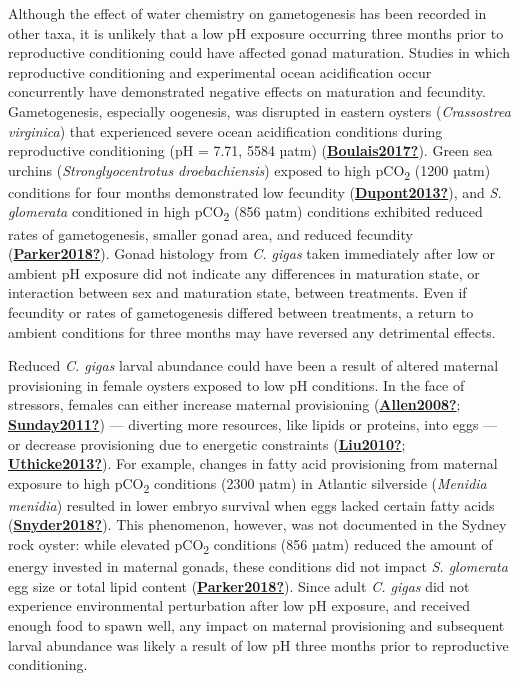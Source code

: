 \documentclass [11pt, proquest] {uwthesis}[2015/03/03]
\begin{document}
Although the effect of water chemistry on gametogenesis has been recorded in other taxa, it is unlikely that a low pH exposure occurring three months prior to reproductive conditioning could have affected gonad maturation. Studies in which reproductive conditioning and experimental ocean acidification occur concurrently have demonstrated negative effects on maturation and fecundity. Gametogenesis, especially oogenesis, was disrupted in eastern oysters (\emph{Crassostrea virginica}) that experienced severe ocean acidification conditions during reproductive conditioning (pH = 7.71, 5584 µatm) (\protect\hyperlink{ref-Boulais2017}{\textbf{Boulais2017?}}). Green sea urchins (\emph{Stronglyocentrotus droebachiensis}) exposed to high pCO\textsubscript{2} (1200 µatm) conditions for four months demonstrated low fecundity (\protect\hyperlink{ref-Dupont2013}{\textbf{Dupont2013?}}), and \emph{S. glomerata} conditioned in high pCO\textsubscript{2} (856 µatm) conditions exhibited reduced rates of gametogenesis, smaller gonad area, and reduced fecundity (\protect\hyperlink{ref-Parker2018}{\textbf{Parker2018?}}). Gonad histology from \emph{C. gigas} taken immediately after low or ambient pH exposure did not indicate any differences in maturation state, or interaction between sex and maturation state, between treatments. Even if fecundity or rates of gametogenesis differed between treatments, a return to ambient conditions for three months may have reversed any detrimental effects.

Reduced \emph{C. gigas} larval abundance could have been a result of altered maternal provisioning in female oysters exposed to low pH conditions. In the face of stressors, females can either increase maternal provisioning (\protect\hyperlink{ref-Allen2008}{\textbf{Allen2008?}}; \protect\hyperlink{ref-Sunday2011}{\textbf{Sunday2011?}}) --- diverting more resources, like lipids or proteins, into eggs --- or decrease provisioning due to energetic constraints (\protect\hyperlink{ref-Liu2010}{\textbf{Liu2010?}}; \protect\hyperlink{ref-Uthicke2013}{\textbf{Uthicke2013?}}). For example, changes in fatty acid provisioning from maternal exposure to high pCO\textsubscript{2} conditions (2300 µatm) in Atlantic silverside (\emph{Menidia menidia}) resulted in lower embryo survival when eggs lacked certain fatty acids (\protect\hyperlink{ref-Snyder2018}{\textbf{Snyder2018?}}). This phenomenon, however, was not documented in the Sydney rock oyster: while elevated pCO\textsubscript{2} conditions (856 µatm) reduced the amount of energy invested in maternal gonads, these conditions did not impact \emph{S. glomerata} egg size or total lipid content (\protect\hyperlink{ref-Parker2018}{\textbf{Parker2018?}}). Since adult \emph{C. gigas} did not experience environmental perturbation after low pH exposure, and received enough food to spawn well, any impact on maternal provisioning and subsequent larval abundance was likely a result of low pH three months prior to reproductive conditioning.
\end{document}
